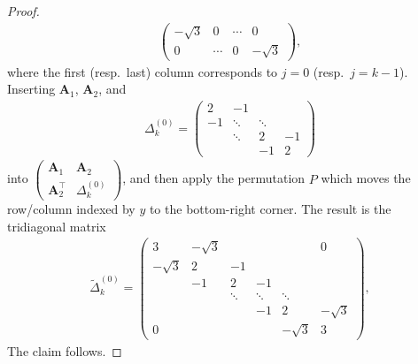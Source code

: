 \documentclass[10pt,a4paper]{amsart}
\begin{document}
\begin{proof}
\begin{align*}
\begin{pmatrix}
                -\sqrt3 & 0 &\cdots &0\\
                0&\cdots &0 &-\sqrt3
                \end{pmatrix},
        \end{align*}
    where the first (resp.\ last) column corresponds to $j=0$
    (resp.\ $j=k-1$). Inserting $\mathbf{A}_1$, $\mathbf{A}_2$, and
        \begin{align*}
            \Delta_k^{(0)}=\begin{pmatrix}
                2&-1\\[2pt]-1&\ddots&\ddots\\
                &\ddots&2&-1\\
                &&-1&2
                \end{pmatrix}
        \end{align*}
    into $\begin{pmatrix}\mathbf{A}_1&\mathbf{A}_2\\[2pt]\mathbf{A}_2^{\top}&\Delta_k^{(0)}\end{pmatrix}$, and then apply the permutation $P$ which moves the row/column indexed by $y$ to the bottom-right corner.  The result is the tridiagonal matrix
        \begin{align*}
            \widetilde{\Delta}_k^{(0)}=
            \begin{pmatrix}
            3 & -\sqrt3 &        &        &        & 0  \\
            -\sqrt3 & 2 & -1     &        &        &    \\
                    & -1 & 2 & -1&        &        \\
                    &    & \ddots & \ddots & \ddots &   \\
                    &    &        & -1 & 2 & -\sqrt3 \\
            0       &    &        &    & -\sqrt3 & 3
            \end{pmatrix},
        \end{align*}
    The claim follows.
\end{proof}
\end{document}
